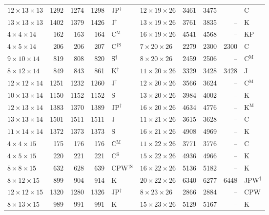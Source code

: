 \begin{longtable}{@{}lrrrl@{\hspace{6mm}}lrrrl@{}}
$12{\times}13{\times}13$ & 1292 & 1274 & 1298 & JP$^{\dagger}$ & $12{\times}19{\times}26$ & 3461 & 3475 & -- & C\\
$13{\times}13{\times}13$ & 1402 & 1379 & 1426 & J$^{\dagger}$ & $13{\times}19{\times}26$ & 3761 & 3835 & -- & K\\
$4{\times}4{\times}14$ & 162 & 163 & 164 & C$^{\mathrm{M}}$ & $16{\times}19{\times}26$ & 4541 & 4568 & -- & KP\\
$4{\times}5{\times}14$ & 206 & 206 & 207 & C$^{\dagger\mathrm{S}}$ & $7{\times}20{\times}26$ & 2279 & 2300 & 2300 & C\\
$9{\times}10{\times}14$ & 819 & 808 & 820 & S$^{\dagger}$ & $8{\times}20{\times}26$ & 2459 & 2506 & -- & C$^{\mathrm{M}}$\\
$8{\times}12{\times}14$ & 849 & 843 & 861 & K$^{\dagger}$ & $11{\times}20{\times}26$ & 3329 & 3428 & 3428 & J\\
$12{\times}12{\times}14$ & 1251 & 1232 & 1260 & J$^{\dagger}$ & $12{\times}20{\times}26$ & 3566 & 3624 & -- & C$^{\mathrm{M}}$\\
$10{\times}13{\times}14$ & 1150 & 1152 & 1152 & S & $13{\times}20{\times}26$ & 3984 & 4002 & -- & K\\
$12{\times}13{\times}14$ & 1383 & 1370 & 1389 & JP$^{\dagger}$ & $16{\times}20{\times}26$ & 4634 & 4776 & -- & K$^{\mathrm{M}}$\\
$13{\times}13{\times}14$ & 1501 & 1511 & 1511 & J & $11{\times}21{\times}26$ & 3615 & 3628 & -- & C\\
$11{\times}14{\times}14$ & 1372 & 1373 & 1373 & S & $16{\times}21{\times}26$ & 4908 & 4969 & -- & K\\
$4{\times}4{\times}15$ & 175 & 176 & 176 & C$^{\mathrm{M}}$ & $11{\times}22{\times}26$ & 3771 & 3776 & -- & C\\
$4{\times}5{\times}15$ & 220 & 221 & 221 & C$^{\mathrm{S}}$ & $15{\times}22{\times}26$ & 4936 & 4966 & -- & K\\
$8{\times}8{\times}15$ & 632 & 628 & 639 & CPW$^{\dagger\mathrm{S}}$ & $16{\times}22{\times}26$ & 5136 & 5182 & -- & K\\
$8{\times}12{\times}15$ & 899 & 904 & 914 & K & $20{\times}22{\times}26$ & 6340 & 6277 & 6448 & JPW$^{\dagger}$\\
$12{\times}12{\times}15$ & 1320 & 1280 & 1326 & JP$^{\dagger}$ & $8{\times}23{\times}26$ & 2866 & 2884 & -- & CPW\\
$8{\times}13{\times}15$ & 989 & 991 & 991 & K & $15{\times}23{\times}26$ & 5129 & 5167 & -- & K\\

\end{longtable}

